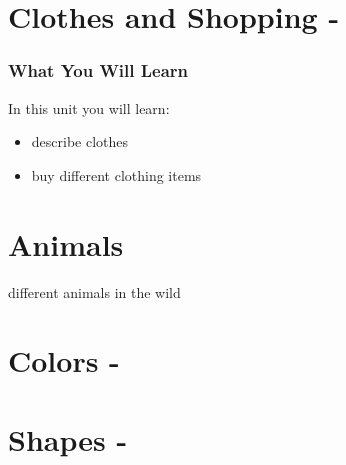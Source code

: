 \newpage{}
\index{}
\chapter*{Clothes and Shopping - }
\subsection{What You Will Learn}
In this unit you will learn:
\begin{itemize}
\item describe clothes
\item buy different clothing items
\end{itemize}\newpage

\newpage{}
\chapter*{Animals}
different animals in the wild\\
\index{}
\chapter*{Colors - }
\index{}
\chapter*{Shapes - }
